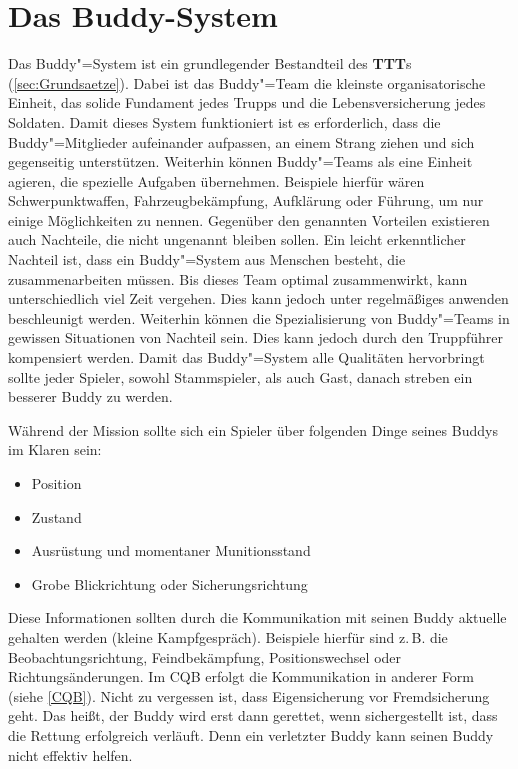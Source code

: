 \section{Das Buddy-System}
	Das Buddy"=System ist ein grundlegender Bestandteil des \textbf{TTT}s (\ref{sec:Grundsaetze}). Dabei ist das Buddy"=Team die kleinste organisatorische Einheit, das solide Fundament jedes Trupps und die Lebensversicherung jedes Soldaten. Damit dieses System funktioniert ist es erforderlich, dass die Buddy"=Mitglieder aufeinander aufpassen, an einem Strang ziehen und sich gegenseitig unterstützen. Weiterhin können Buddy"=Teams als eine Einheit agieren, die spezielle Aufgaben übernehmen. Beispiele hierfür wären Schwerpunktwaffen, Fahrzeugbekämpfung, Aufklärung oder Führung, um nur einige Möglichkeiten zu nennen. Gegenüber den genannten Vorteilen existieren auch Nachteile, die nicht ungenannt bleiben sollen. Ein leicht erkenntlicher Nachteil ist, dass ein Buddy"=System aus Menschen besteht, die zusammenarbeiten müssen. Bis dieses Team optimal zusammenwirkt, kann unterschiedlich viel Zeit vergehen. Dies kann jedoch unter regelmäßiges anwenden beschleunigt werden. Weiterhin können die Spezialisierung von Buddy"=Teams in gewissen Situationen von Nachteil sein. Dies kann jedoch durch den Truppführer kompensiert werden. Damit das Buddy"=System alle Qualitäten hervorbringt sollte jeder Spieler, sowohl Stammspieler, als auch Gast, danach streben ein besserer Buddy zu werden.
	
	Während der Mission sollte sich ein Spieler über folgenden Dinge seines Buddys im Klaren sein:
	\begin{itemize}
		\item Position
		\item Zustand 
		\item Ausrüstung und momentaner Munitionsstand
		\item Grobe Blickrichtung oder Sicherungsrichtung
	\end{itemize}
	Diese Informationen sollten durch die Kommunikation mit seinen Buddy aktuelle gehalten werden (kleine Kampfgespräch). Beispiele hierfür sind z.\,B. die Beobachtungsrichtung, Feindbekämpfung, Positionswechsel oder Richtungsänderungen. Im  \ac{CQB} erfolgt die Kommunikation in anderer Form (siehe \ref{CQB}).
	Nicht zu vergessen ist, dass Eigensicherung vor Fremdsicherung geht. Das heißt, der Buddy wird erst dann gerettet, wenn sichergestellt ist, dass die Rettung erfolgreich verläuft. Denn ein verletzter Buddy kann seinen Buddy nicht effektiv helfen.